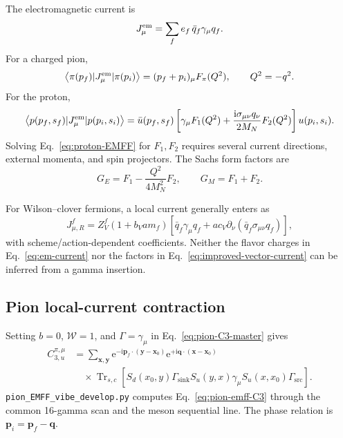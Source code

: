 \documentclass[11pt,a4paper]{article}
\numberwithin{equation}{section}
\newcommand{\ii}{\mathrm{i}}
\newcommand{\ee}{\mathrm{e}}
\newcommand{\Trsc}{\operatorname{Tr}_{s,c}}
\newcommand{\avg}[1]{\left\langle #1\right\rangle}
\newcommand{\cW}{\mathcal{W}}
\newcommand{\Gsrc}{\Gamma_{\mathrm{src}}}
\newcommand{\Gsink}{\Gamma_{\mathrm{sink}}}
\newcommand{\code}[1]{%
  \ifmmode\text{\texttt{\detokenize{#1}}}\else\nolinkurl{#1}\fi}
\begin{document}
The electromagnetic current is
\begin{equation}
 J_\mu^{\rm em}
 =\sum_f e_f\,\bar q_f\gamma_\mu q_f.
 \label{eq:em-current}
\end{equation}
For a charged pion,
\begin{equation}
 \avg{\pi(p_f)|J_\mu^{\rm em}|\pi(p_i)}
 =(p_f+p_i)_\mu F_\pi(Q^2),\qquad
 Q^2=-q^2.
 \label{eq:pion-EMFF}
\end{equation}
For the proton,
\begin{equation}
 \avg{p(p_f,s_f)|J_\mu^{\rm em}|p(p_i,s_i)}
 =
 \bar u(p_f,s_f)
 \left[
 \gamma_\mu F_1(Q^2)
 +\frac{\ii\sigma_{\mu\nu}q_\nu}{2M_N}F_2(Q^2)
 \right]
 u(p_i,s_i).
 \label{eq:proton-EMFF}
\end{equation}
Solving Eq.~\eqref{eq:proton-EMFF} for \(F_1,F_2\) requires several current
directions, external momenta, and spin projectors.  The Sachs form factors are
\begin{equation}
 G_E=F_1-\frac{Q^2}{4M_N^2}F_2,\qquad
 G_M=F_1+F_2.
\end{equation}

For Wilson--clover fermions, a local current generally enters as
\begin{equation}
 J_{\mu,R}^f
 =Z_V^f(1+b_Vam_f)
 \left[
 \bar q_f\gamma_\mu q_f
 +ac_V\partial_\nu(\bar q_f\sigma_{\mu\nu}q_f)
 \right],
 \label{eq:improved-vector-current}
\end{equation}
with scheme/action-dependent coefficients.  Neither the flavor charges in
Eq.~\eqref{eq:em-current} nor the factors in
Eq.~\eqref{eq:improved-vector-current} can be inferred from a gamma insertion.

\subsection{Pion local-current contraction}

Setting \(b=0\), \(\cW=1\), and \(\Gamma=\gamma_\mu\) in
Eq.~\eqref{eq:pion-C3-master} gives
\begin{align}
 C_{3,u}^{\pi,\mu}
 &=\sum_{\boldsymbol x,\boldsymbol y}
 \ee^{-\ii\boldsymbol p_f\cdot(\boldsymbol y-\boldsymbol x_0)}
 \ee^{+\ii\boldsymbol q\cdot(\boldsymbol x-\boldsymbol x_0)}
 \nonumber\\
 &\quad\times
 \Trsc\left[
 S_d(x_0,y)\Gsink
 S_u(y,x)\gamma_\mu S_u(x,x_0)\Gsrc
 \right].
 \label{eq:pion-emff-C3}
\end{align}
\code{pion_EMFF_vibe_develop.py} computes
Eq.~\eqref{eq:pion-emff-C3} through the common 16-gamma scan and the meson
sequential line.  The phase relation is
\(\boldsymbol p_i=\boldsymbol p_f-\boldsymbol q\).
\end{document}
